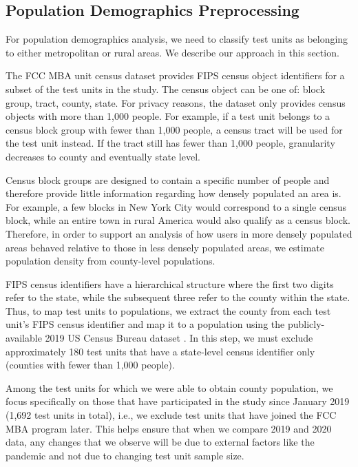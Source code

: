 \documentclass[conference,10pt]{IEEEtran}
\begin{document}
\subsection{Population Demographics Preprocessing}

For population demographics analysis, we need to classify test units as belonging to either metropolitan or rural areas. We describe our approach in this section.

The \gls{FCC} \gls{MBA} unit census dataset provides \gls{FIPS} census object identifiers for a subset of the test units in the study. The census object can be one of: block group, tract, county, state. For privacy reasons, the dataset only provides census objects with more than 1,000 people. For example, if a test unit belongs to a census block group with fewer than 1,000 people, a census tract will be used for the test unit instead. If the tract still has fewer than 1,000 people, granularity decreases to county and eventually state level.

Census block groups are designed to contain a specific number of people and therefore provide little information regarding how densely populated an area is. For example, a few blocks in New York City would correspond to a single census block, while an entire town in rural America would also qualify as a census block. Therefore, in order to support an analysis of how users in more densely populated areas behaved relative to those in less densely populated areas, we estimate population density from county-level populations.

\gls{FIPS} census identifiers have a hierarchical structure where the first two digits refer to the state, while the subsequent three refer to the county within the state. Thus, to map test units to populations, we extract the county from each test unit's \gls{FIPS} census identifier and map it to a population using the publicly-available 2019 \gls{US} Census Bureau dataset \cite{census}. In this step, we must exclude approximately 180 test units that have a state-level census identifier only (counties with fewer than 1,000 people).

Among the test units for which we were able to obtain county population, we focus specifically on those that have participated in the study since January 2019 (1,692 test units in total), i.e., we exclude test units that have joined the \gls{FCC} \gls{MBA} program later. This helps ensure that when we compare 2019 and 2020 data, any changes that we observe will be due to external factors like the pandemic and not due to changing test unit sample size.
\end{document}
